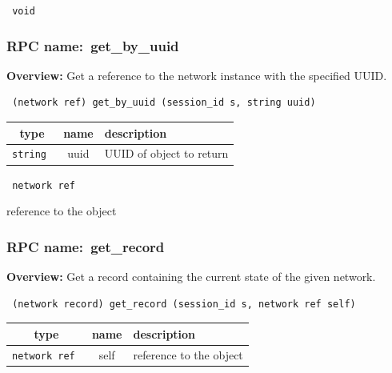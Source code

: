 \vspace{0.3cm}

{\tt 
void
}



\vspace{0.3cm}
\vspace{0.3cm}
\vspace{0.3cm}
\subsubsection{RPC name:~get\_by\_uuid}

{\bf Overview:} 
Get a reference to the network instance with the specified UUID.

\begin{verbatim} (network ref) get_by_uuid (session_id s, string uuid)\end{verbatim}



 
\vspace{0.3cm}
\begin{tabular}{|c|c|p{7cm}|}
 \hline
{\bf type} & {\bf name} & {\bf description} \\ \hline
{\tt string } & uuid & UUID of object to return \\ \hline 

\end{tabular}

\vspace{0.3cm}

{\tt 
network ref
}


reference to the object
\vspace{0.3cm}
\vspace{0.3cm}
\vspace{0.3cm}
\subsubsection{RPC name:~get\_record}

{\bf Overview:} 
Get a record containing the current state of the given network.

\begin{verbatim} (network record) get_record (session_id s, network ref self)\end{verbatim}



 
\vspace{0.3cm}
\begin{tabular}{|c|c|p{7cm}|}
 \hline
{\bf type} & {\bf name} & {\bf description} \\ \hline
{\tt network ref } & self & reference to the object \\ \hline 

\end{tabular}

